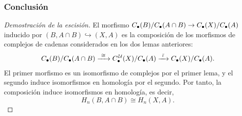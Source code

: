 \begin{frame}
  \frametitle{Conclusión}

  \begin{proof}[Demostración de la escisión]
    El morfismo
    $C_\bullet(B)/C_\bullet(A\cap B)\to C_\bullet(X)/C_\bullet(A)$
    inducido por
    $(B,A\cap B)\hookrightarrow(X,A)$ es la composición de los morfismos de complejos de cadenas considerados en los dos lemas anteriores:
    \[
      C_\bullet(B)/C_\bullet(A\cap B)
      \xrightarrow{\ \cong\ }
      C^{\mkern2mu\mathcal{U}}_\bullet(X)/C_\bullet(A)
      \xrightarrow{\ \bar\iota\ }
      C_\bullet(X)/C_\bullet(A).
    \]
    El primer morfismo es un isomorfismo de complejos por el primer lema, y
    el segundo induce isomorfismos en homología por el segundo. Por
    tanto, la composición induce isomorfismos en homología, es decir,
    \[
      H_n(B,A\cap B)\cong H_n(X,A).
    \]
  \end{proof}
\end{frame}
